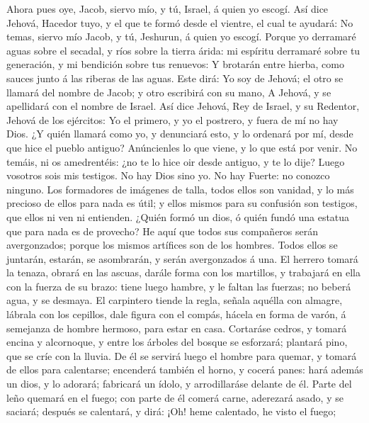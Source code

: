  Ahora pues oye, Jacob, siervo mío, y tú, Israel, á quien
yo escogí.  Así dice Jehová, Hacedor tuyo, y el que te
formó desde el vientre, el cual te ayudará: No temas, siervo mío Jacob,
y tú, Jeshurun, á quien yo escogí.  Porque yo derramaré
aguas sobre el secadal, y ríos sobre la tierra árida: mi espíritu
derramaré sobre tu generación, y mi bendición sobre tus renuevos:
 Y brotarán entre hierba, como sauces junto á las riberas
de las aguas.  Este dirá: Yo soy de Jehová; el otro se
llamará del nombre de Jacob; y otro escribirá con su mano, A Jehová, y
se apellidará con el nombre de Israel.  Así dice Jehová,
Rey de Israel, y su Redentor, Jehová de los ejércitos: Yo el primero, y
yo el postrero, y fuera de mí no hay Dios.  ¿Y quién
llamará como yo, y denunciará esto, y lo ordenará por mí, desde que hice
el pueblo antiguo? Anúncienles lo que viene, y lo que está por venir.
 No temáis, ni os amedrentéis: ¿no te lo hice oir desde
antiguo, y te lo dije? Luego vosotros sois mis testigos. No hay Dios
sino yo. No hay Fuerte: no conozco ninguno.  Los
formadores de imágenes de talla, todos ellos son vanidad, y lo más
precioso de ellos para nada es útil; y ellos mismos para su confusión
son testigos, que ellos ni ven ni entienden.  ¿Quién
formó un dios, ó quién fundó una estatua que para nada es de provecho?
 He aquí que todos sus compañeros serán avergonzados;
porque los mismos artífices son de los hombres. Todos ellos se juntarán,
estarán, se asombrarán, y serán avergonzados á una.  El
herrero tomará la tenaza, obrará en las ascuas, darále forma con los
martillos, y trabajará en ella con la fuerza de su brazo: tiene luego
hambre, y le faltan las fuerzas; no beberá agua, y se desmaya.
 El carpintero tiende la regla, señala aquélla con
almagre, lábrala con los cepillos, dale figura con el compás, hácela en
forma de varón, á semejanza de hombre hermoso, para estar en casa.
 Cortaráse cedros, y tomará encina y alcornoque, y entre
los árboles del bosque se esforzará; plantará pino, que se críe con la
lluvia.  De él se servirá luego el hombre para quemar, y
tomará de ellos para calentarse; encenderá también el horno, y cocerá
panes: hará además un dios, y lo adorará; fabricará un ídolo, y
arrodillaráse delante de él.  Parte del leño quemará en
el fuego; con parte de él comerá carne, aderezará asado, y se saciará;
después se calentará, y dirá: ¡Oh! heme calentado, he visto el fuego;
